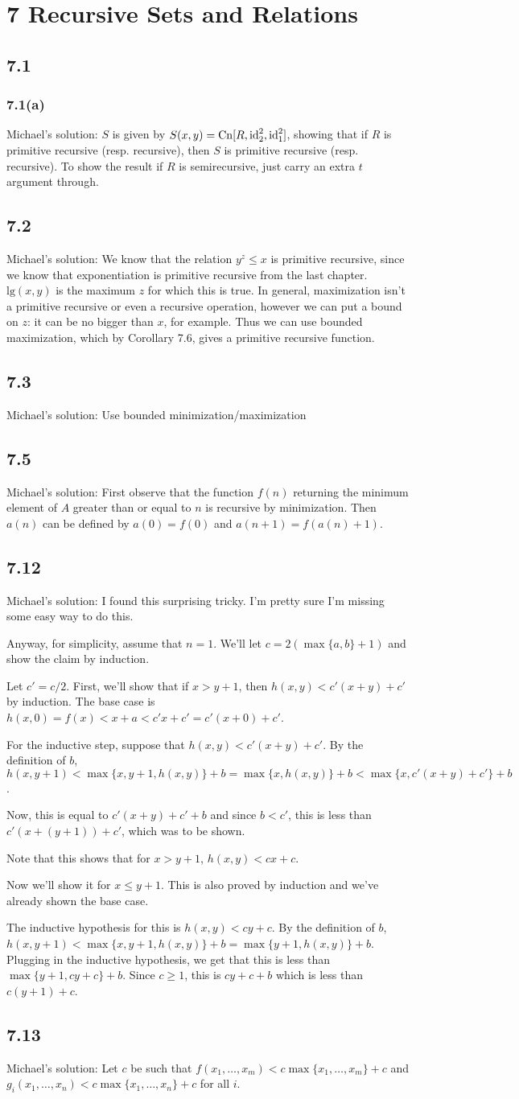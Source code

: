 \documentclass{article}
\newcommand\s{\section*}
\renewcommand\ss{\subsection*}
\newcommand\sss{\subsubsection*}
\newcommand\ms{Michael's solution: } %
\begin{document}
\s{7 Recursive Sets and Relations}
\ss{7.1}
\sss{7.1(a)}
\ms $S$ is given by $S(x,y)=\mathrm{Cn}[R,\mathrm{id}^2_2,\mathrm{id}^2_1]$, showing that if $R$ is primitive recursive (resp. recursive), then $S$ is primitive recursive (resp. recursive).  To show the result if $R$ is semirecursive, just carry an extra $t$ argument through.
\ss{7.2}
\ms We know that the relation $y^z\leq x$ is primitive recursive, since we know that exponentiation is primitive recursive from the 
last chapter.  $\mathrm{lg}(x, y)$ is the maximum $z$ for which
this is true.  In general, maximization isn't a primitive recursive or even a recursive operation, however we can put a bound on $z$: it can be no bigger than $x$, for example.  Thus we can use bounded maximization, which by Corollary 7.6, gives a primitive recursive function.
\ss{7.3}
\ms Use bounded minimization/maximization
\ss{7.5}
\ms First observe that the function $f(n)$ returning the minimum element of $A$ greater than or equal to $n$ is recursive by minimization.  Then $a(n)$ can be defined by $a(0) = f(0)$ and $a(n + 1) = f(a(n) + 1)$.
\ss{7.12}
\ms I found this surprising tricky.  I'm pretty sure I'm missing some easy way to do this.

Anyway, for simplicity, assume that $n=1$.  We'll let $c = 2(\max\{a,b\} + 1)$ and show the claim by
induction.

Let $c' = c/2$.  First, we'll show that if $x>y+1$, then $h(x,y) < c' (x + y) + c'$ by induction.  The base case
is $h(x,0) = f(x) < x + a < c' x + c' = c' (x + 0) + c'$.

For the inductive step, suppose that $h(x,y) < c' (x + y) + c'$.  By the definition of $b$,
$h(x,y+1) < \max\{x,y+1,h(x,y)\} + b = \max\{x,h(x,y)\} + b < \max\{x,c'(x + y) + c'\} + b$.

Now, this is equal to $c'(x+y) + c' + b$ and since $b < c'$, this is less than $c'(x + (y + 1)) + c'$,
which was to be shown.

Note that this shows that for $x > y + 1$, $h(x,y) < c x + c$.

Now we'll show it for $x \leq y + 1$.  This is also proved by induction and we've already shown
the base case.

The inductive hypothesis for this is $h(x,y) < cy + c$.  By the definition of $b$, $h(x,y+1) < \max\{x,y+1,h(x,y)\} + b = \max\{y+1,h(x,y)\} + b$.  Plugging in the inductive hypothesis, we get that this is less than $\max\{y+1,cy+c\} + b$.  Since $c\geq 1$, this is $cy + c + b$ which is less than $c(y+1) + c$.
\ss{7.13}
\ms Let $c$ be such that $f(x_1,\ldots,x_m) < c \max\{x_1,\ldots,x_m\} + c$ and $g_i(x_1,\ldots,x_n) < c \max\{x_1,\ldots,x_n\} + c$ for all $i$.
\end{document}
